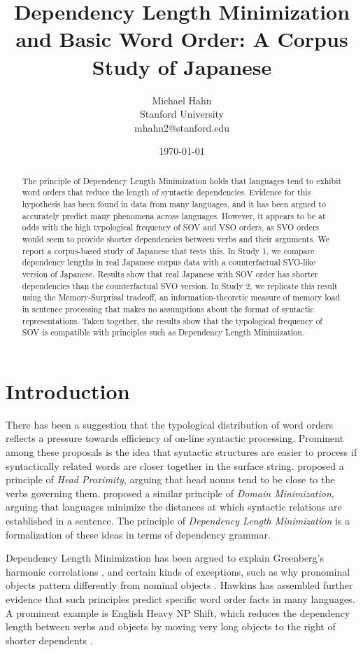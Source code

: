 \documentclass[11pt,a4paper]{article}
\title{Dependency Length Minimization and Basic Word Order: A Corpus Study of Japanese}
\author{Michael Hahn \\ Stanford University \\ mhahn2@stanford.edu}
\date{\today}
\begin{document}
\maketitle
\begin{abstract}
The principle of Dependency Length Minimization holds that languages tend to exhibit word orders that reduce the length of syntactic dependencies.
Evidence for this hypothesis has been found in data from many languages, and it has been argued to accurately predict many phenomena across languages.
However, it appears to be at odds with the high typological frequency of SOV and VSO orders, as SVO orders would seem to provide shorter dependencies between verbs and their arguments.
We report a corpus-based study of Japanese that tests this.
In Study 1, we compare dependency lengths in real Japanese corpus data with a counterfactual SVO-like version of Japanese.
Results show that real Japanese with SOV order has shorter dependencies than the counterfactual SVO version.
In Study 2, we replicate this result using the Memory-Surprisal tradeoff, an information-theoretic measure of memory load in sentence processing that makes no assumptions about the format of syntactic representations. 
Taken together, the results show that the typological frequency of SOV is compatible with principles such as Dependency Length Minimization.
\end{abstract}


\section{Introduction}

There has been a suggestion that the typological distribution of word orders reflects a pressure towards efficiency of on-line syntactic processing.
Prominent among these proposals is the idea that syntactic structures are easier to process if syntactically related words are closer together in the surface string.
\cite{rijkhoff-word-1986} proposed a principle of \emph{Head Proximity}, arguing that head nouns tend to be close to the verbs governing them.
\cite{hawkins2014crosslinguistic} proposed a similar principle of \emph{Domain Minimization}, arguing that languages minimize the distances at which syntactic relations are established in a sentence.
The principle of \emph{Dependency Length Minimization} \citep{temperley2018minimizing} is a formalization of these ideas in terms of dependency grammar.

Dependency Length Minimization has been argued to explain Greenberg's harmonic correlations \citep{rijkhoff-word-1986, hawkins1994performance}, and certain kinds of exceptions, such as why pronominal objects pattern differently from nominal objects \citep{dryer1992greenbergian}. %
Hawkins \citep{hawkins2004efficiency, hawkins2007processing, hawkins2014crosslinguistic} has assembled further evidence that such principles predict specific word order facts in many languages. 
A prominent example is English Heavy NP Shift, which reduces the dependency length between verbs and objects by moving very long objects to the right of shorter dependents \citep{hawkins1994performance, wasow1997end, yamashita2001long}.
\end{document}
